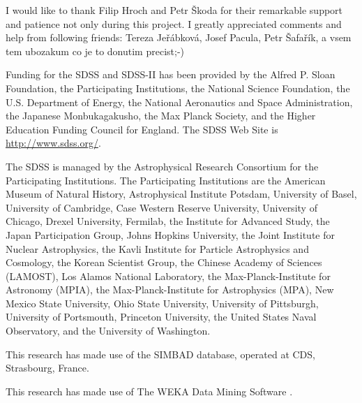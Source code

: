 

\begin{acknowledgements}      %


  I would like to thank Filip Hroch and Petr Škoda for their
  remarkable support and patience not only during this project. I
  greatly appreciated comments and help from following friends: Tereza
  Jeřábková, Josef Pacula, Petr Šafařík, a vsem tem ubozakum co je to
  donutim precist;-) 


  \bigskip 
  Funding for the SDSS and SDSS-II has been provided by the
  Alfred P. Sloan Foundation, the Participating Institutions, the
  National Science Foundation, the U.S. Department of Energy, the
  National Aeronautics and Space Administration, the Japanese
  Monbukagakusho, the Max Planck Society, and the Higher Education
  Funding Council for England. The SDSS Web Site is
  \url{http://www.sdss.org/}.

  The SDSS is managed by the Astrophysical Research Consortium for the
  Participating Institutions. The Participating Institutions are the
  American Museum of Natural History, Astrophysical Institute Potsdam,
  University of Basel, University of Cambridge, Case Western Reserve
  University, University of Chicago, Drexel University, Fermilab, the
  Institute for Advanced Study, the Japan Participation Group, Johns
  Hopkins University, the Joint Institute for Nuclear Astrophysics,
  the Kavli Institute for Particle Astrophysics and Cosmology, the
  Korean Scientist Group, the Chinese Academy of Sciences (LAMOST),
  Los Alamos National Laboratory, the Max-Planck-Institute for
  Astronomy (MPIA), the Max-Planck-Institute for Astrophysics (MPA),
  New Mexico State University, Ohio State University, University of
  Pittsburgh, University of Portsmouth, Princeton University, the
  United States Naval Observatory, and the University of Washington.

  \bigskip

  This research has made use of the SIMBAD database, operated at CDS,
  Strasbourg, France.

  \bigskip

  This research has made use of The WEKA Data Mining Software
  \citep{hall2009weka}.




\end{acknowledgements}


